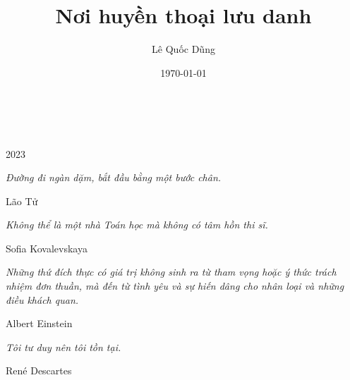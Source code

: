 \documentclass[oneside]{book}
\title{Nơi huyền thoại lưu danh}
\author{Lê Quốc Dũng}
\date{\today}
\begin{document}
\begin{titlepage}
		\\
			
		\vspace{10mm}
		\\
		\vspace{\fill}
		\centering \large{2023}
\end{titlepage}

\newpage

\vspace*{2cm}

{\Large
	\textit{Đường đi ngàn dặm, bắt đầu bằng một bước chân.}
}

{\Large{
		{
		\begin{raggedleft}
			\vspace{.5cm}
			\hfill{Lão Tử}
		\end{raggedleft}
	}
}}

\vspace{.5cm}

{\Large
	\textit{Không thể là một nhà Toán học mà không có tâm hồn thi sĩ.}
}

{\Large{
		{
		\begin{raggedleft}
			\vspace{.5cm}
			\hfill{Sofia Kovalevskaya}
		\end{raggedleft}
	}
}}

\vspace{.5cm}

{\Large
	\textit{Những thứ đích thực có giá trị không sinh ra từ tham
		vọng hoặc ý thức trách nhiệm đơn thuần, mà đến từ tình yêu và
		sự hiến dâng cho nhân loại và những điều khách quan.}
}

{\Large{
		{
		\begin{raggedleft}
			\vspace{.5cm}
			\hfill{Albert Einstein}
		\end{raggedleft}
	}
}}

\vspace{.5cm}

{\Large 
	\textit{Tôi tư duy nên tôi tồn tại.}
}

{\Large{
		{
		\begin{raggedleft}
			\vspace{.5cm}
			\hfill{\foreignlanguage{french}{René Descartes}}
		\end{raggedleft}
	}
}}
\end{document}
